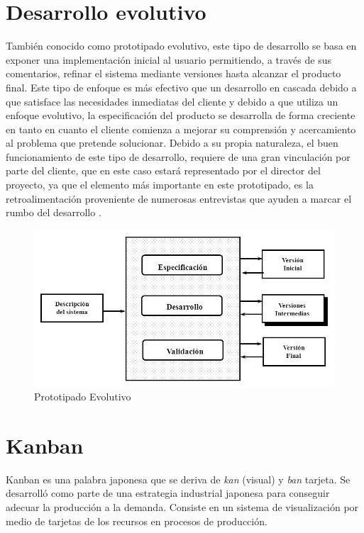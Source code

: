 \section{Desarrollo evolutivo}
También conocido como prototipado evolutivo, este tipo de desarrollo se basa en exponer una implementación inicial al usuario permitiendo, a través de sus comentarios, refinar el sistema mediante versiones hasta alcanzar el producto final.
Este tipo de enfoque es más efectivo que un desarrollo en cascada debido a que satisface las necesidades inmediatas del cliente y debido a que utiliza un enfoque evolutivo, la especificación del producto se desarrolla de forma creciente en tanto en cuanto el cliente comienza a mejorar su comprensión y acercamiento al problema que pretende solucionar.
Debido a su propia naturaleza, el buen funcionamiento de este tipo de desarrollo, requiere de una gran vinculación por parte del cliente, que en este caso estará representado por el director del proyecto, ya que el elemento más importante en este prototipado, es la retroalimentación proveniente de numerosas entrevistas que ayuden a marcar el rumbo del desarrollo \cite{Somm06}.

\begin{figure}[H]
\centering
\includegraphics[scale=1, fbox={\fboxrule} 4mm]{images/04-metodo/01-protipado_evolutivo.jpg}
\caption{Prototipado Evolutivo}
\label{fig:prototipado_evolutivo}
\end{figure}

\section{Kanban}
Kanban es una palabra japonesa que se deriva de \textit{kan} (visual) y \textit{ban} tarjeta. Se desarrolló como parte de una estrategia industrial japonesa para conseguir adecuar la producción a la demanda. Consiste en un sistema de visualización por medio de tarjetas de los recursos en procesos de producción.

